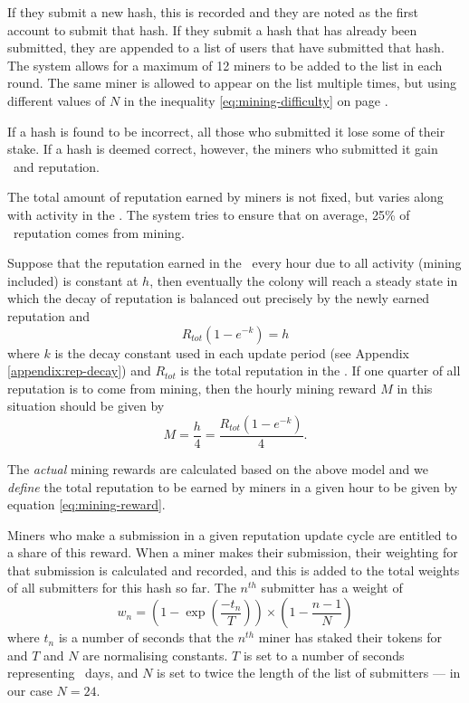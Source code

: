 If they submit a new hash, this is recorded and they are noted as the first account to submit that hash. If they submit a hash that has already been submitted, they are appended to a list of users that have submitted that hash. The system allows for a maximum of 12 miners to be added to the list in each round. The same miner is allowed to appear on the list multiple times, but using different values of $N$ in the inequality \eqref{eq:mining-difficulty} on page \pageref{eq:mining-difficulty}.

If a hash is found to be incorrect, all those who submitted it lose some of their stake. If a hash is deemed correct, however, the miners who submitted it gain \rcts\ and reputation.

The total amount of reputation earned by miners is not fixed, but varies along with activity in the \rc. The system tries to ensure that on average, 25\% of \rc\ reputation comes from mining. %

Suppose that the reputation earned in the \rc\ every hour due to all activity (mining included) is constant at $h$, then eventually the colony will reach a steady state in which the decay of reputation is balanced out precisely by the newly earned reputation and
\begin{equation}
 R_{tot} \left( 1 - e^{-k} \right) = h
\end{equation}
\noindent where $k$ is the decay constant used in each update period (see Appendix \ref{appendix:rep-decay}) and $R_{tot}$ is the total reputation in the \rc. If one quarter of all reputation is to come from mining, then the hourly mining reward $M$ in this situation should be given by
\begin{equation}\label{eq:mining-reward}
 M = \frac{h}{4} = \frac{R_{tot} \left( 1 - e^{-k} \right)}{4}.
\end{equation}

The \emph{actual} mining rewards are calculated based on the above model and we \emph{define} the total reputation to be earned by miners in a given hour to be given by equation \eqref{eq:mining-reward}.

Miners who make a submission in a given reputation update cycle are entitled to a share of this reward. When a miner makes their submission, their weighting for that submission is calculated and recorded, and this is added to the total weights of all submitters for this hash so far. The $n^{th}$ submitter has a weight of
\begin{equation}\label{eq:miner-weighting}
 w_n = \left(1 - \exp\left(\frac{-t_n}{T}\right)\right) \times \left( 1 - \frac{n-1}{N} \right)
\end{equation}
where $t_n$ is a number of seconds that the $n^{th}$ miner has staked their tokens for and $T$ and $N$ are normalising constants. $T$ is set to a number of seconds representing \miningstakeduration\ days, and $N$ is set to twice the length of the list of submitters --- in our case $N=24$.

